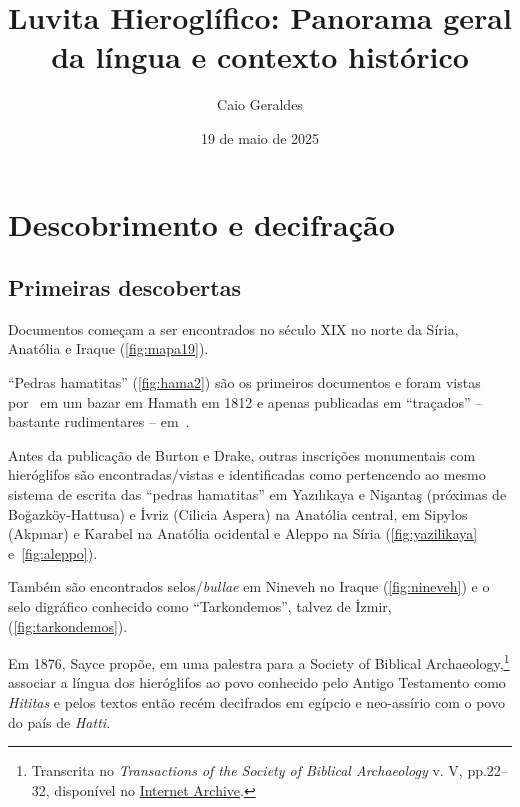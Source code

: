 \documentclass[article]{luvita}
\title{Luvita Hieroglífico: Panorama geral da língua e contexto histórico}
\author{Caio Geraldes}
\date{19 de maio de 2025}
\begin{document}
\frontmatter

\mainmatter%

\maketitle

\chapter{Descobrimento e decifração}

\section{Primeiras descobertas}

\begin{compactitem}
	\item Documentos começam a ser encontrados no século XIX no norte da Síria,
	Anatólia e Iraque (\autoref{fig:mapa19}).
	\begin{compactitem}
		\item ``Pedras hamatitas'' (\autoref{fig:hama2}) são os primeiros documentos e
		foram vistas por~\citet[146--7]{Burckhardt1822} em um bazar em Hamath em
		1812 e apenas publicadas em ``traçados'' -- bastante rudimentares --
		em~\citet[333--60]{UnexploredSyriaI}.
		\item Antes da publicação de Burton e Drake, outras inscrições monumentais
		com hieróglifos são encontradas\slash{}vistas e identificadas como
		pertencendo ao mesmo sistema de escrita das ``pedras hamatitas'' em
		Yazılıkaya e Nişantaş (próximas de Boğazköy-Hattusa) e İvriz (Cilicia
		Aspera) na Anatólia central, em Sipylos (Akpınar) e Karabel na Anatólia
		ocidental e Aleppo na Síria (\autoref{fig:yazilikaya} e~\autoref{fig:aleppo}).
		\item Também são encontrados selos\slash{}\emph{bullae} em Nineveh no
		Iraque (\autoref{fig:nineveh}) e o selo digráfico conhecido como
		``Tarkondemos'', talvez de İzmir, (\autoref{fig:tarkondemos}).
	\end{compactitem}
	\item Em 1876, Sayce propõe, em uma palestra para a Society of Biblical
	Archaeology,\footnote{Transcrita no \emph{Transactions of the Society of
			Biblical Archaeology} v. V, pp.22--32, disponível no
		\href{https://archive.org/details/transactionssoc04nashgoog}{Internet
			Archive}.} associar a língua dos hieróglifos ao povo conhecido pelo Antigo
	Testamento como \emph{Hititas} e pelos textos então recém decifrados em
	egípcio e neo-assírio com o povo do país de \emph{Hatti}.
\end{compactitem}
\end{document}
